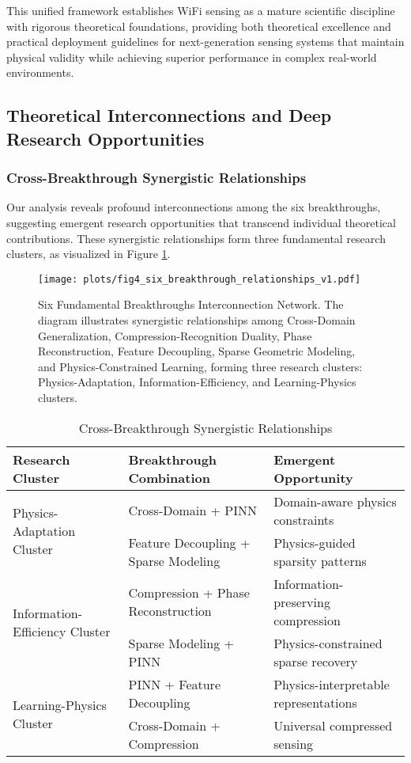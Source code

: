 \documentclass[journal]{IEEEtran}
\begin{document}
This unified framework establishes WiFi sensing as a mature scientific discipline with rigorous theoretical foundations, providing both theoretical excellence and practical deployment guidelines for next-generation sensing systems that maintain physical validity while achieving superior performance in complex real-world environments.

\subsection{Theoretical Interconnections and Deep Research Opportunities}

\subsubsection{Cross-Breakthrough Synergistic Relationships}

Our analysis reveals profound interconnections among the six breakthroughs, suggesting emergent research opportunities that transcend individual theoretical contributions. These synergistic relationships form three fundamental research clusters, as visualized in Figure \ref{fig:six_breakthrough_relationships}.

\begin{figure}[h]
\centering
\texttt{[image: plots/fig4\_six\_breakthrough\_relationships\_v1.pdf]}
\caption{Six Fundamental Breakthroughs Interconnection Network. The diagram illustrates synergistic relationships among Cross-Domain Generalization, Compression-Recognition Duality, Phase Reconstruction, Feature Decoupling, Sparse Geometric Modeling, and Physics-Constrained Learning, forming three research clusters: Physics-Adaptation, Information-Efficiency, and Learning-Physics clusters.}
\label{fig:six_breakthrough_relationships}
\end{figure}

\begin{table}[h]
\centering
\caption{Cross-Breakthrough Synergistic Relationships}
\label{tab:synergistic_relationships}
\begin{tabular}{|l|l|l|}
\hline
\textbf{Research Cluster} & \textbf{Breakthrough Combination} & \textbf{Emergent Opportunity} \\
\hline
\multirow{2}{*}{Physics-Adaptation Cluster} & Cross-Domain + PINN & Domain-aware physics constraints \\
& Feature Decoupling + Sparse Modeling & Physics-guided sparsity patterns \\
\hline
\multirow{2}{*}{Information-Efficiency Cluster} & Compression + Phase Reconstruction & Information-preserving compression \\
& Sparse Modeling + PINN & Physics-constrained sparse recovery \\
\hline
\multirow{2}{*}{Learning-Physics Cluster} & PINN + Feature Decoupling & Physics-interpretable representations \\
& Cross-Domain + Compression & Universal compressed sensing \\
\hline
\end{tabular}
\end{table}
\end{document}
